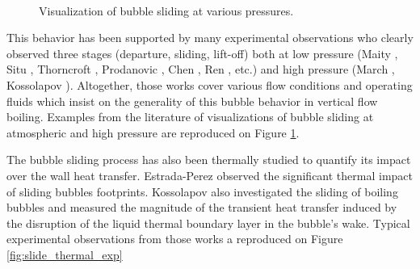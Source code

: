 \begin{figure}[H]

\begin{center}

\\

\end{center}

\caption{Visualization of bubble sliding at various pressures.}
\label{fig:slide_exp_vis}
\end{figure}


This behavior has been supported by many experimental observations who clearly observed three stages (departure, sliding, lift-off) both at low pressure (Maity \cite{maity_effect_2000}, Situ \cite{situ_bubble_2005}, Thorncroft \cite{thorncroft_experimental_1998}, Prodanovic \cite{prodanovic_2006}, Chen \cite{chen_prediction_2012}, Ren \cite{ren_development_2020}, etc.) and high pressure (March \cite{march_1990}, Kossolapov \cite{kossolapov_experimental_2021}). Altogether, those works cover various flow conditions and operating fluids which insist on the generality of this bubble behavior in vertical flow boiling. Examples from the literature of visualizations of bubble sliding at atmospheric and high pressure are reproduced on Figure \ref{fig:slide_exp_vis}.

\npar

The bubble sliding process has also been thermally studied to quantify its impact over the wall heat transfer. Estrada-Perez \etal \cite{estrada-perez_time-resolved_2018} observed the significant thermal impact of sliding bubbles footprints. Kossolapov \cite{kossolapov_experimental_2021} also investigated the sliding of boiling bubbles and measured the magnitude of the transient heat transfer induced by the disruption of the liquid thermal boundary layer in the bubble's wake. Typical experimental observations from those works a reproduced on Figure \ref{fig:slide_thermal_exp}


